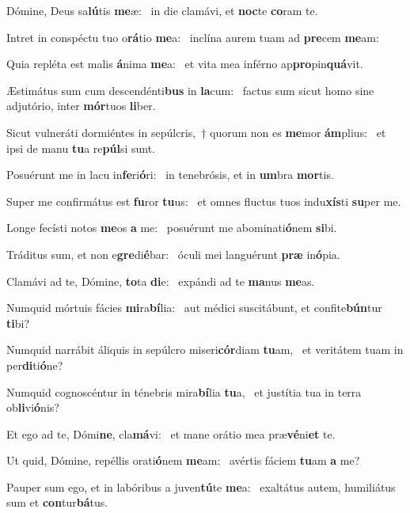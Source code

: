 \item Dómine, Deus sa\textbf{lú}tis \textbf{me}æ:~\psstar{} in die clamávi, et \textbf{noc}te \textbf{co}ram te.
\item Intret in conspéctu tuo o\textbf{rá}tio \textbf{me}a:~\psstar{} inclína aurem tuam ad \textbf{pre}cem \textbf{me}am:
\item Quia repléta est malis \textbf{á}nima \textbf{me}a:~\psstar{} et vita mea inférno ap\textbf{pro}pin\textbf{quá}vit.
\item Æstimátus sum cum descendénti\textbf{bus} in \textbf{la}cum:~\psstar{} factus sum sicut homo sine adjutório, inter \textbf{mór}tuos \textbf{li}ber.
\item Sicut vulneráti dormiéntes in sepúlcris,~† quorum non es \textbf{me}mor \textbf{ám}plius:~\psstar{} et ipsi de manu \textbf{tu}a re\textbf{púl}si sunt.
\item Posuérunt me in lacu in\textbf{fe}ri\textbf{ó}ri:~\psstar{} in tenebrósis, et in \textbf{um}bra \textbf{mor}tis.
\item Super me confirmátus est \textbf{fu}ror \textbf{tu}us:~\psstar{} et omnes fluctus tuos indu\textbf{xís}ti \textbf{su}per me.
\item Longe fecísti notos \textbf{me}os \textbf{a} me:~\psstar{} posuérunt me abominati\textbf{ó}nem \textbf{si}bi.
\item Tráditus sum, et non e\textbf{gre}di\textbf{é}bar:~\psstar{} óculi mei languérunt \textbf{præ} in\textbf{ó}pia.
\item Clamávi ad te, Dómine, \textbf{to}ta \textbf{di}e:~\psstar{} expándi ad te \textbf{ma}nus \textbf{me}as.
\item Numquid mórtuis fácies \textbf{mi}ra\textbf{bí}lia:~\psstar{} aut médici suscitábunt, et confite\textbf{bún}tur \textbf{ti}bi?
\item Numquid narrábit áliquis in sepúlcro miseri\textbf{cór}diam \textbf{tu}am,~\psstar{} et veritátem tuam in per\textbf{di}ti\textbf{ó}ne?
\item Numquid cognoscéntur in ténebris mira\textbf{bí}lia \textbf{tu}a,~\psstar{} et justítia tua in terra ob\textbf{li}vi\textbf{ó}nis?
\item Et ego ad te, Dómi\textbf{ne}, cla\textbf{má}vi:~\psstar{} et mane orátio mea præ\textbf{vé}ni\textbf{et} te.
\item Ut quid, Dómine, repéllis orati\textbf{ó}nem \textbf{me}am:~\psstar{} avértis fáciem \textbf{tu}am \textbf{a} me?
\item Pauper sum ego, et in labóribus a juven\textbf{tú}te \textbf{me}a:~\psstar{} exaltátus autem, humiliátus sum et \textbf{con}tur\textbf{bá}tus.
